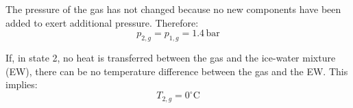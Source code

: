 The pressure of the gas has not changed because no new components have been added to exert additional pressure. Therefore:  
\[
p_{2,g} = p_{1,g} = 1.4 \, \text{bar}
\]  

If, in state 2, no heat is transferred between the gas and the ice-water mixture (EW), there can be no temperature difference between the gas and the EW. This implies:  
\[
T_{2,g} = 0^\circ\text{C}
\]